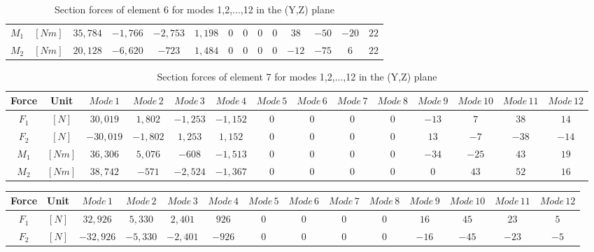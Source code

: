 \documentclass[11pt,a4paper,titlepage]{report}
\begin{document}
\begin{appendix}
\begin{landscape}
\begin{table}[]
\begin{tiny}
\begin{tabular}{c|c|c|c|c|c|c|c|c|c|c|c|c|c}
    $M_1$ & $[Nm]$ & $35,784$ &  $-1,766$ &  $-2,753$  &  $1,198$ &  $0$ & $0$ & $0$ & $0$ &  $38$ &  $-50$ &  $-20$ & $22$\\
    $M_2$ & $[Nm]$ & $20,128$ &  $-6,620$  & $-723$  &  $1,484$  &  $0$  & $0$ & $0$ & $0$ &  $-12$ &  $-75$    & $6$ & $22$\\
        \end{tabular}
        \end{tiny}
    \caption{Section forces of element 6 for modes 1,2,...,12 in the (Y,Z) plane}
    \label{tab:my_label}
\end{table}
\begin{table}[]
    \centering
    \begin{tiny}
    \begin{tabular}{c|c|c|c|c|c|c|c|c|c|c|c|c|c}
    Force & Unit & $Mode\,1$ & $Mode\,2$ & $Mode\,3$ & $Mode\,4$ & $Mode\,5$ & $Mode\,6$ & $Mode\,7$ & $Mode\,8$ & $Mode\,9$ & $Mode\,10$ & $Mode\,11$ & $Mode\,12$\\
    \hline
   $F_1$ & $[N]$ & $30,019$ & $1,802$ & $-1,253$ & $-1,152$ & $0$ & $0$ & $0$ & $0$ & $-13$ &   $7$  &  $38$  &  $14$\\
   $F_2$ & $[N]$ & $-30,019$ &  $-1,802$ & $1,253$ & $1,152$ & $0$ & $0$ & $0$ & $0$ & $13$ &  $-7$  & $-38$ &  $-14$\\
    $M_1$ & $[Nm]$ & $36,306$ & $5,076$ & $-608$ & $-1,513$ & $0$ & $0$ & $0$ & $0$ & $-34$ &  $-25$ & $43$ &  $19$\\
    $M_2$ & $[Nm]$ & $38,742$ &  $-571$ &  $-2,524$ &  $-1,367$ & $0$ & $0$ & $0$ & $0$ & $0$ &  $43$ & $52$ & $16$\\
        \end{tabular}
        \end{tiny}
    \caption{Section forces of element 7 for modes 1,2,...,12 in the (Y,Z) plane}
    \label{tab:my_label}
\end{table}
\begin{table}[]
    \centering
    \begin{tiny}
    \begin{tabular}{c|c|c|c|c|c|c|c|c|c|c|c|c|c}
    Force & Unit & $Mode\,1$ & $Mode\,2$ & $Mode\,3$ & $Mode\,4$ & $Mode\,5$ & $Mode\,6$ & $Mode\,7$ & $Mode\,8$ & $Mode\,9$ & $Mode\,10$ & $Mode\,11$ & $Mode\,12$\\
    \hline
   $F_1$ & $[N]$ & $32,926 $ & $5,330$ & $2,401$ & $926$ & $0$ & $0$ & $0$ & $0$ & $16 $ & $45 $ & $ 23$ &  $5$\\
   $F_2$ & $[N]$ & $-32,926$ &  $-5,330$ & $-2,401$ & $-926 $ & $0$ & $0$ & $0$ & $0$ & $-16$ & $-45$ & $-23$ &  $-5$\\

\end{tabular}
\end{tiny}
\end{table}
\end{landscape}
\end{appendix}
\end{document}
